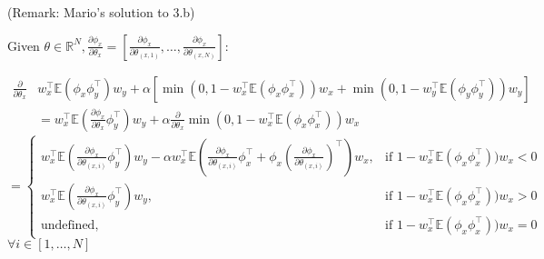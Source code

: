 \documentclass[a4paper]{article}
\newcommand{\E}{\mathbb{E}}
\newcommand{\1}{\mathds{1}}
\begin{document}
(Remark: Mario's solution to 3.b)


Given $\theta \in \mathbb{R}^N, \frac{\partial\phi_x}{\partial \theta_x} = [\frac{\partial\phi_x}{\partial \theta_(x, 1)}, \dots, \frac{\partial\phi_x}{\partial \theta_(x, N)}]$:

\begin{align*}
    \frac{\partial}{\partial \theta_x} & w^{\top}_x\E(\phi_x\phi_y^{\top})w_y
                                                                       + \alpha\left[\min(0, 1-w^{\top}_x\E(\phi_x\phi^{\top}_x))w_x + 
                                                                                               \min(0, 1-w^{\top}_y\E(\phi_y\phi^{\top}_y))w_y
                                                                                       \right] \\
                                                                   & = w^{\top}_x\E( \frac{\partial\phi_x}{\partial \theta_x} \phi^{\top}_y)w_y
                                                                       + \alpha  \frac{\partial}{\partial \theta_x} \min(0, 1-w^{\top}_x\E(\phi_x\phi^{\top}_x))w_x
\end{align*} 
$$
 = \begin{cases}
                                                                   w^{\top}_x\E( \frac{\partial\phi_x}{\partial \theta_(x, i)} \phi^{\top}_y)w_y
                                                                       - \alpha  w^{\top}_x\E(
												    \frac{\partial\phi_x}{\partial \theta_(x, i)} \phi^{\top}_x
												 + \phi_x(\frac{\partial\phi_x}{\partial \theta_(x, i)})^{\top}
							   )w_x, &  \text{if } 1-w^{\top}_x\E(\phi_x\phi^{\top}_x))w_x < 0 \\
                                                                   w^{\top}_x\E( \frac{\partial\phi_x}{\partial \theta_(x, i)} \phi^{\top}_y)w_y,  &  \text{if } 1-w^{\top}_x\E(\phi_x\phi^{\top}_x))w_x > 0 \\
                                                                   \text{undefined}, & \text{if } 1-w^{\top}_x\E(\phi_x\phi^{\top}_x))w_x = 0
\end{cases}
$$
$\forall i \in [1,\dots, N]$
\end{document}
